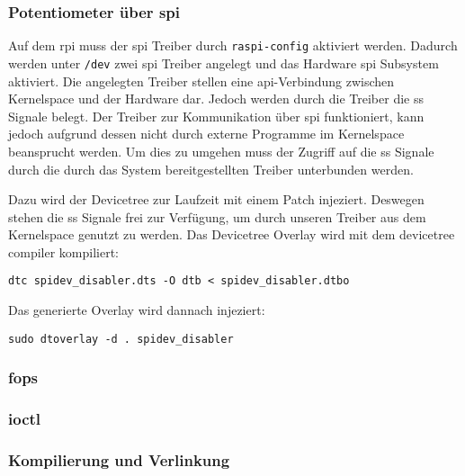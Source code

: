 \subsubsection{Potentiometer über \acrshort{spi}}



Auf dem \gls{rpi} muss der \gls{spi} Treiber durch \texttt{raspi-config} aktiviert werden.
Dadurch werden unter \texttt{/dev} zwei \gls{spi} Treiber angelegt und das Hardware \gls{spi} Subsystem aktiviert.
Die angelegten Treiber stellen eine \gls{api}-Verbindung zwischen Kernelspace und der Hardware dar.
Jedoch werden durch die Treiber die \gls{ss} Signale belegt.
Der Treiber zur Kommunikation über \gls{spi} funktioniert, kann jedoch aufgrund dessen nicht durch externe Programme im Kernelspace beansprucht werden.
Um dies zu umgehen muss der Zugriff auf die \gls{ss} Signale durch die durch das System bereitgestellten Treiber unterbunden werden.

Dazu wird der Devicetree zur Laufzeit mit einem Patch injeziert.
Deswegen stehen die \gls{ss} Signale frei zur Verfügung, um durch unseren Treiber aus dem Kernelspace genutzt zu werden.
Das Devicetree Overlay wird mit dem devicetree compiler kompiliert:
\begin{lstlisting}
dtc spidev_disabler.dts -O dtb < spidev_disabler.dtbo
\end{lstlisting}
Das generierte Overlay wird dannach injeziert:
\begin{lstlisting}
sudo dtoverlay -d . spidev_disabler
\end{lstlisting}

\subsubsection{\acrshort{fops}}

\subsubsection{\Acrshort{ioctl}}

\subsubsection{Kompilierung und Verlinkung}

